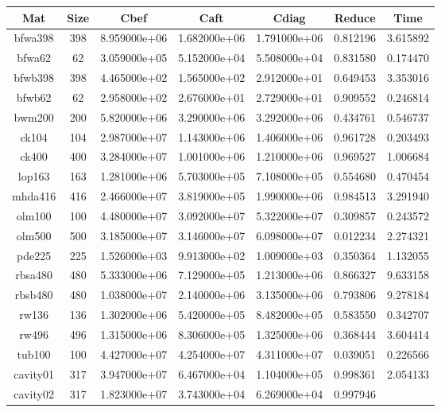 \begin{table}[h]
  \begin{tabular}{ccccccc}
    \hline
    Mat & Size & Cbef & Caft & Cdiag & Reduce & Time\\
    \hline
    bfwa398 & 398 & 8.959000e+06 & 1.682000e+06 & 1.791000e+06 & 0.812196 &
    3.615892\\
    bfwa62 & 62 & 3.059000e+05 & 5.152000e+04 & 5.508000e+04 & 0.831580 &
    0.174470\\
    bfwb398 & 398 & 4.465000e+02 & 1.565000e+02 & 2.912000e+01 & 0.649453 &
    3.353016\\
    bfwb62 & 62 & 2.958000e+02 & 2.676000e+01 & 2.729000e+01 & 0.909552 &
    0.246814\\
    bwm200 & 200 & 5.820000e+06 & 3.290000e+06 & 3.292000e+06 & 0.434761 &
    0.546737\\
    ck104 & 104 & 2.987000e+07 & 1.143000e+06 & 1.406000e+06 & 0.961728 &
    0.203493\\
    ck400 & 400 & 3.284000e+07 & 1.001000e+06 & 1.210000e+06 & 0.969527 &
    1.006684\\
    lop163 & 163 & 1.281000e+06 & 5.703000e+05 & 7.108000e+05 & 0.554680 &
    0.470454\\
    mhda416 & 416 & 2.466000e+07 & 3.819000e+05 & 1.990000e+06 & 0.984513 &
    3.291940\\
    olm100 & 100 & 4.480000e+07 & 3.092000e+07 & 5.322000e+07 & 0.309857 &
    0.243572\\
    olm500 & 500 & 3.185000e+07 & 3.146000e+07 & 6.098000e+07 & 0.012234 &
    2.274321\\
    pde225 & 225 & 1.526000e+03 & 9.913000e+02 & 1.009000e+03 & 0.350364 &
    1.132055\\
    rbsa480 & 480 & 5.333000e+06 & 7.129000e+05 & 1.213000e+06 & 0.866327 &
    9.633158\\
    rbsb480 & 480 & 1.038000e+07 & 2.140000e+06 & 3.135000e+06 & 0.793806 &
    9.278184\\
    rw136 & 136 & 1.302000e+06 & 5.420000e+05 & 8.482000e+05 & 0.583550 &
    0.342707\\
    rw496 & 496 & 1.315000e+06 & 8.306000e+05 & 1.325000e+06 & 0.368444 &
    3.604414\\
    tub100 & 100 & 4.427000e+07 & 4.254000e+07 & 4.311000e+07 & 0.039051 &
    0.226566\\
    cavity01 & 317 & 3.947000e+07 & 6.467000e+04 & 1.104000e+05 & 0.998361 &
    2.054133\\
    cavity02 & 317 & 1.823000e+07 & 3.743000e+04 & 6.269000e+04 & 0.997946 &

\end{tabular}
\end{table}
